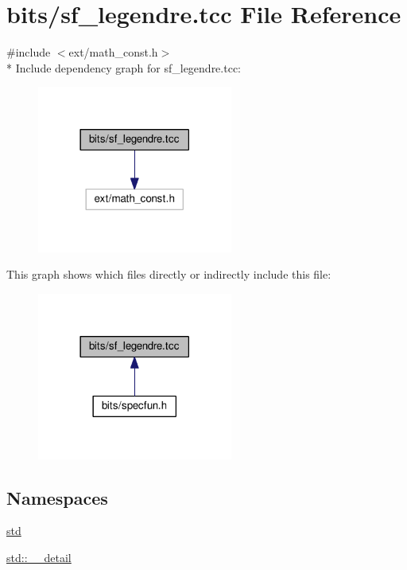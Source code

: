 \hypertarget{sf__legendre_8tcc}{}\section{bits/sf\+\_\+legendre.tcc File Reference}
\label{sf__legendre_8tcc}
{\ttfamily \#include $<$ext/math\+\_\+const.\+h$>$}\\*
Include dependency graph for sf\+\_\+legendre.\+tcc\+:
\nopagebreak
\begin{figure}[H]
\begin{center}
\leavevmode
\includegraphics[width=182pt]{sf__legendre_8tcc__incl}
\end{center}
\end{figure}
This graph shows which files directly or indirectly include this file\+:
\nopagebreak
\begin{figure}[H]
\begin{center}
\leavevmode
\includegraphics[width=182pt]{sf__legendre_8tcc__dep__incl}
\end{center}
\end{figure}
\subsection*{Namespaces}
\begin{DoxyCompactItemize}
\item 
 \hyperlink{namespacestd}{std}
\item 
 \hyperlink{namespacestd_1_1____detail}{std\+::\+\_\+\+\_\+detail}
\end{DoxyCompactItemize}
